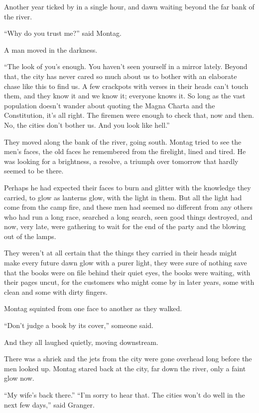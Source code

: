\documentclass[11pt,openany]{book}
\begin{document}
Another year ticked by in a single hour, and dawn waiting beyond the far bank of the river.

``Why do you trust me?'' said Montag.

A man moved in the darkness.

``The look of you's enough. You haven't seen yourself in a mirror lately. Beyond that, the city has never cared so much about us to bother with an elaborate chase like this to find us. A few crackpots with verses in their heads can't touch them, and they know it and we know it; everyone knows it. So long as the vast population doesn't wander about quoting the Magna Charta and the Constitution, it's all right. The firemen were enough to check that, now and then. No, the cities don't bother us. And you look like hell.''

They moved along the bank of the river, going south. Montag tried to see the men's faces, the old faces he remembered from the firelight, lined and tired. He was looking for a brightness, a resolve, a triumph over tomorrow that hardly seemed to be there.

Perhaps he had expected their faces to burn and glitter with the knowledge they carried, to glow as lanterns glow, with the light in them. But all the light had come from the camp fire, and these men had seemed no different from any others who had run a long race, searched a long search, seen good things destroyed, and now, very late, were gathering to wait for the end of the party and the blowing out of the lamps.

They weren't at all certain that the things they carried in their heads might make every future dawn glow with a purer light, they were sure of nothing save that the books were on file behind their quiet eyes, the books were waiting, with their pages uncut, for the customers who might come by in later years, some with clean and some with dirty fingers.

Montag squinted from one face to another as they walked.

``Don't judge a book by its cover,'' someone said.

And they all laughed quietly, moving downstream.

There was a shriek and the jets from the city were gone overhead long before the men looked up. Montag stared back at the city, far down the river, only a faint glow now.

``My wife's back there.'' ``I'm sorry to hear that. The cities won't do well in the next few days,'' said Granger.
\end{document}

